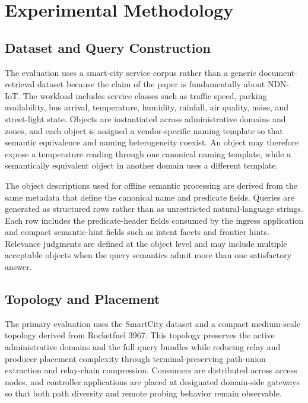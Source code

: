 \documentclass[journal]{IEEEtran}
\begin{document}
\section{Experimental Methodology}

\subsection{Dataset and Query Construction}

The evaluation uses a smart-city service corpus rather than a generic document-retrieval dataset because the claim of the paper is fundamentally about NDN-IoT. The workload includes service classes such as traffic speed, parking availability, bus arrival, temperature, humidity, rainfall, air quality, noise, and street-light state. Objects are instantiated across administrative domains and zones, and each object is assigned a vendor-specific naming template so that semantic equivalence and naming heterogeneity coexist. An object may therefore expose a temperature reading through one canonical naming template, while a semantically equivalent object in another domain uses a different template.

The object descriptions used for offline semantic processing are derived from the same metadata that define the canonical name and predicate fields. Queries are generated as structured rows rather than as unrestricted natural-language strings. Each row includes the predicate-header fields consumed by the ingress application and compact semantic-hint fields such as intent facets and frontier hints. Relevance judgments are defined at the object level and may include multiple acceptable objects when the query semantics admit more than one satisfactory answer.

\subsection{Topology and Placement}

The primary evaluation uses the SmartCity dataset and a compact medium-scale topology derived from Rocketfuel 3967. This topology preserves the active administrative domains and the full query bundles while reducing relay and producer placement complexity through terminal-preserving path-union extraction and relay-chain compression. Consumers are distributed across access nodes, and controller applications are placed at designated domain-side gateways so that both path diversity and remote probing behavior remain observable.
\end{document}
